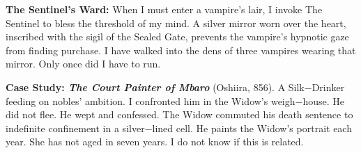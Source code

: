\textbf{The Sentinel's Ward:} When I must enter a vampire's lair, I invoke The Sentinel to bless the threshold of my mind. A silver mirror worn over the heart, inscribed with the sigil of the Sealed Gate, prevents the vampire's hypnotic gaze from finding purchase. I have walked into the dens of three vampires wearing that mirror. Only once did I have to run.

\textbf{Case Study: \emph{The Court Painter of Mbaro}} (Oshiira, 856). A Silk−Drinker feeding on nobles' ambition. I confronted him in the Widow's weigh−house. He did not flee. He wept and confessed. The Widow commuted his death sentence to indefinite confinement in a silver−lined cell. He paints the Widow's portrait each year. She has not aged in seven years. I do not know if this is related.

